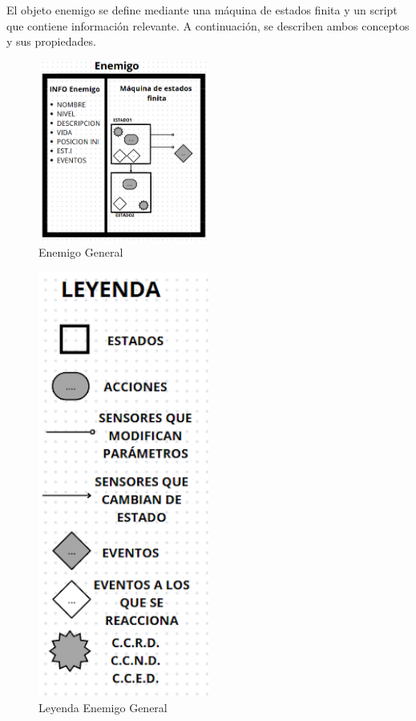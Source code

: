 El objeto enemigo se define mediante una máquina de estados finita y un script que contiene información relevante. A continuación, se describen ambos conceptos y sus propiedades.\\
\begin{figure}[h]
	\centering
	\includegraphics[width = 0.5\textwidth]{Imagenes/EnemgioGeneral.png}
	\caption{Enemigo General }
	\label{fig:enemgiogeneral}
\end{figure}
\begin{figure}[h]
	\centering
	\includegraphics[width = 0.5\textwidth]{Imagenes/LeyendaEnemigoGeneral.png}
	\caption{Leyenda Enemigo General }
	\label{fig:leyendaenemgiogeneral}
\end{figure}

